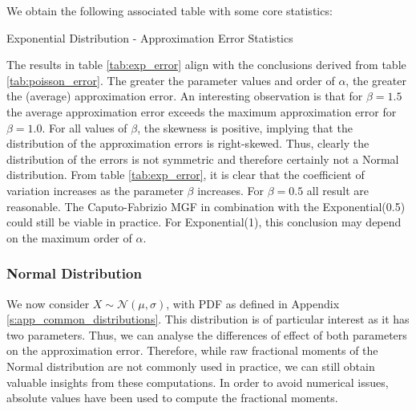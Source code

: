 We obtain the following associated table with some core statistics:
\begin{table}[H]
    \centering

\caption{Exponential Distribution - Approximation Error Statistics} 
\label{tab:exp_error}
\end{table}

The results in table \ref{tab:exp_error} align with the conclusions derived from table \ref{tab:poisson_error}. The greater the parameter values and order of \(\alpha\), the greater the (average) approximation error.  An interesting observation is that for \(\beta = 1.5\) the average approximation error exceeds the maximum approximation error for \(\beta = 1.0\). For all values of \(\beta\), the skewness is positive, implying that the distribution of the approximation errors is right-skewed. Thus, clearly the distribution of the errors is not symmetric and therefore certainly not a Normal distribution.  From table \ref{tab:exp_error}, it is clear that the coefficient of variation increases as the parameter \(\beta\) increases. For \(\beta = 0.5\) all result are reasonable. The Caputo-Fabrizio MGF in combination with the Exponential(0.5) could still be viable in practice. For Exponential(1), this conclusion may depend on the maximum order of \(\alpha\).

\subsubsection{Normal Distribution}
We now consider \(X \sim \mathcal{N}(\mu, \sigma)\), with PDF as defined in Appendix \ref{s:app_common_distributions}. This distribution is of particular interest as it has two parameters. Thus, we can analyse the differences of effect of both parameters on the approximation error. Therefore, while raw fractional moments of the Normal distribution are not commonly used in practice, we can still obtain valuable insights from these computations. In order to avoid numerical issues, absolute values have been used to compute the fractional moments.

